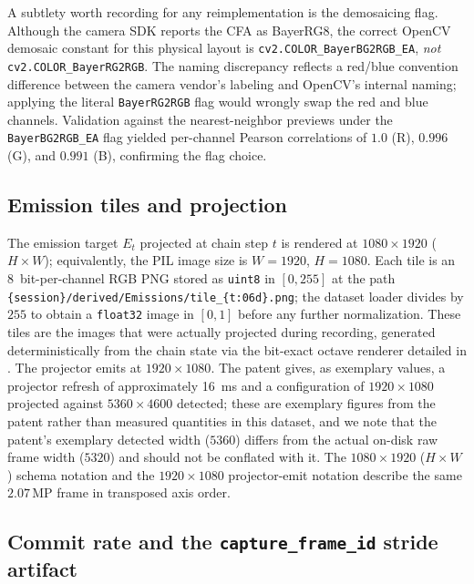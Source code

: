 A subtlety worth recording for any reimplementation is the demosaicing flag. Although the camera SDK reports the CFA as BayerRG8, the correct OpenCV demosaic constant for this physical layout is \texttt{cv2.COLOR\_BayerBG2RGB\_EA}, \emph{not} \texttt{cv2.COLOR\_BayerRG2RGB}. The naming discrepancy reflects a red/blue convention difference between the camera vendor's labeling and OpenCV's internal naming; applying the literal \texttt{BayerRG2RGB} flag would wrongly swap the red and blue channels. Validation against the nearest-neighbor previews under the \texttt{BayerBG2RGB\_EA} flag yielded per-channel Pearson correlations of $1.0$ (R), $0.996$ (G), and $0.991$ (B), confirming the flag choice.

\subsection{Emission tiles and projection}
\label{sec:hardware:emission}

The emission target $E_t$ projected at chain step $t$ is rendered at $1080 \times 1920$ ($H \times W$); equivalently, the PIL image size is $W{=}1920$, $H{=}1080$. Each tile is an \SI{8}{bit}-per-channel RGB PNG stored as \texttt{uint8} in $[0,255]$ at the path \texttt{\{session\}/derived/Emissions/tile\_\{t:06d\}.png}; the dataset loader divides by $255$ to obtain a \texttt{float32} image in $[0,1]$ before any further normalization. These tiles are the images that were actually projected during recording, generated deterministically from the chain state via the bit-exact octave renderer detailed in . The projector emits at $1920 \times 1080$. The patent \cite{patent2025} gives, as exemplary values, a projector refresh of approximately \SI{16}{\milli\second} and a configuration of $1920\times1080$ projected against $5360\times4600$ detected; these are exemplary figures from the patent rather than measured quantities in this dataset, and we note that the patent's exemplary detected width ($5360$) differs from the actual on-disk raw frame width ($5320$) and should not be conflated with it. The $1080\times1920$ ($H\times W$) schema notation and the $1920\times1080$ projector-emit notation describe the same $2.07$\,MP frame in transposed axis order.

\subsection{Commit rate and the \texttt{capture\_frame\_id} stride artifact}
\label{sec:hardware:rate}

